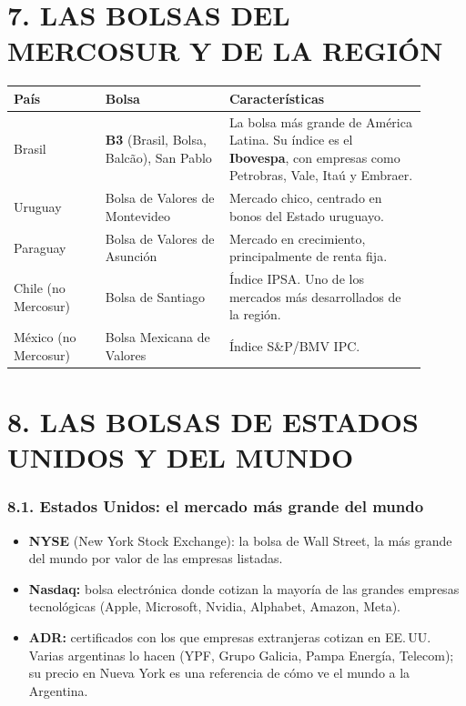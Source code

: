\section*{7. LAS BOLSAS DEL MERCOSUR Y DE LA REGIÓN}

\begin{center}
\small
\begin{tabular}{|p{0.20\linewidth}|p{0.27\linewidth}|p{0.43\linewidth}|}
\hline
\textbf{País} & \textbf{Bolsa} & \textbf{Características} \\ \hline
Brasil & \textbf{B3} (Brasil, Bolsa, Balcão), San Pablo & La bolsa más grande de América Latina.
Su índice es el \textbf{Ibovespa}, con empresas como Petrobras, Vale, Itaú y Embraer. \\ \hline
Uruguay & Bolsa de Valores de Montevideo & Mercado chico, centrado en bonos del Estado
uruguayo. \\ \hline
Paraguay & Bolsa de Valores de Asunción & Mercado en crecimiento, principalmente de renta fija.
\\ \hline
Chile (no Mercosur) & Bolsa de Santiago & Índice IPSA. Uno de los mercados más desarrollados de
la región. \\ \hline
México (no Mercosur) & Bolsa Mexicana de Valores & Índice S\&P/BMV IPC. \\ \hline
\end{tabular}
\end{center}

\section*{8. LAS BOLSAS DE ESTADOS UNIDOS Y DEL MUNDO}

\subsubsection*{8.1. Estados Unidos: el mercado más grande del mundo}
\begin{itemize}
  \item \textbf{NYSE} (New York Stock Exchange): la bolsa de Wall Street, la más grande del
        mundo por valor de las empresas listadas.
  \item \textbf{Nasdaq:} bolsa electrónica donde cotizan la mayoría de las grandes empresas
        tecnológicas (Apple, Microsoft, Nvidia, Alphabet, Amazon, Meta).
  \item \textbf{ADR:} certificados con los que empresas extranjeras cotizan en EE.\,UU. Varias
        argentinas lo hacen (YPF, Grupo Galicia, Pampa Energía, Telecom); su precio en Nueva
        York es una referencia de cómo ve el mundo a la Argentina.
\end{itemize}

